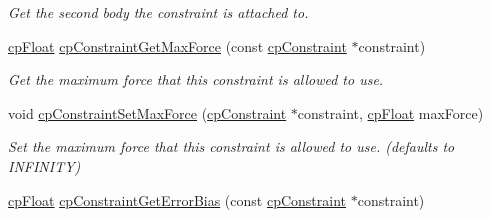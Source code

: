 \begin{DoxyCompactItemize}
\begin{DoxyCompactList}\small\item\em Get the second body the constraint is attached to. \end{DoxyCompactList}\item 
\hypertarget{group__cp_constraint_gabf3dd5da523a9ff6f54d2f4e5231220d}{}\hyperlink{group__basic_types_gac1ed65573e035bf892505768c852d8d3}{cp\+Float} \hyperlink{group__cp_constraint_gabf3dd5da523a9ff6f54d2f4e5231220d}{cp\+Constraint\+Get\+Max\+Force} (const \hyperlink{structcp_constraint}{cp\+Constraint} $\ast$constraint)\label{group__cp_constraint_gabf3dd5da523a9ff6f54d2f4e5231220d}

\begin{DoxyCompactList}\small\item\em Get the maximum force that this constraint is allowed to use. \end{DoxyCompactList}\item 
\hypertarget{group__cp_constraint_ga006fc4aa97b69de20a3e4892b256087b}{}void \hyperlink{group__cp_constraint_ga006fc4aa97b69de20a3e4892b256087b}{cp\+Constraint\+Set\+Max\+Force} (\hyperlink{structcp_constraint}{cp\+Constraint} $\ast$constraint, \hyperlink{group__basic_types_gac1ed65573e035bf892505768c852d8d3}{cp\+Float} max\+Force)\label{group__cp_constraint_ga006fc4aa97b69de20a3e4892b256087b}

\begin{DoxyCompactList}\small\item\em Set the maximum force that this constraint is allowed to use. (defaults to I\+N\+F\+I\+N\+I\+T\+Y) \end{DoxyCompactList}\item 
\hypertarget{group__cp_constraint_ga0de81143fea34d6a444e9fe832bdc33d}{}\hyperlink{group__basic_types_gac1ed65573e035bf892505768c852d8d3}{cp\+Float} \hyperlink{group__cp_constraint_ga0de81143fea34d6a444e9fe832bdc33d}{cp\+Constraint\+Get\+Error\+Bias} (const \hyperlink{structcp_constraint}{cp\+Constraint} $\ast$constraint)\label{group__cp_constraint_ga0de81143fea34d6a444e9fe832bdc33d}


\end{DoxyCompactItemize}
